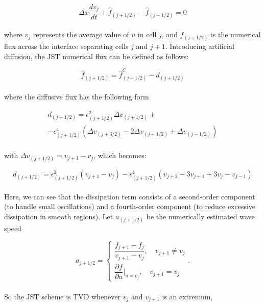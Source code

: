 \documentclass[a5paper]{sapthesis}
\begin{document}
	\begin{equation}
		\Delta x \dfrac{d v_j}{d t} + \hat{f}_{(j+1/2)} -  \hat{f}_{(j-1/2)} = 0
		\label{semidiscretescheme}
	\end{equation} 
	\\
	where $v_j$ represents the average value of $u$ in cell $j$, and $f_{(j+1/2)}$ is the numerical flux across the interface separating cells $j$ and $j+1$. 
	Introducing artificial diffusion, the JST numerical flux can be defined as follows:
	
	\begin{equation}
		\hat{f}_{(j+1/2)} = \hat{f}^C_{(j+1/2)} - d_{(j+1/2)}
	\end{equation}
	\\
	where the diffusive flux has the following form
	
	\begin{equation}
		\begin{aligned}
			d_{(j+1/2)} = \epsilon^2_{(j+1/2)} \Delta v_{(j+1/2)} +\\
			- \epsilon^4_{(j+1/2)}(\Delta v_{(j+3/2)} - 2\Delta v_{(j+1/2)} + \Delta v_{(j-1/2)})
		\end{aligned}		
	\end{equation}
	\\
	with $\Delta v_{(j+1/2)} = v_{j+1} -v_j$, which becomes:
	
	\begin{equation}
		d_{(j+1/2)} = \epsilon^2_{(j+1/2)} (v_{j+1}-v_j) - \epsilon^4_{(j+1/2)}(v_{j+2}-3v_{j+1}+3v_j-v_{j-1})
	\end{equation}
	\\
	Here, we can see that the dissipation term consists of a second-order component (to handle small oscillations) and a fourth-order component (to reduce excessive dissipation in smooth regions). 
	Let $a_{(j+1/2)}$ be the numerically estimated wave speed
	
	\begin{equation}
		a_{j+1/2} = 
		\begin{cases}
			\dfrac{f_{j+1}-f_j}{v_{j+1}-v_j}, \quad v_{j+1} \neq v_j \\[0.6cm]
			\dfrac{\partial f}{\partial u}\bigg\rvert_{u=v_j}, \quad v_{j+1} = v_j 
		\end{cases}.
	\end{equation}
	\\
	So the JST scheme is TVD whenever $v_j$ and $v_{j+1}$ is an extremum,
	
\end{document}
